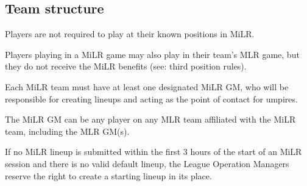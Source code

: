 \subsection{Team structure}
\begin{deepEnumerate}
	\item Players are not required to play at their known positions in MiLR.
    \item Players playing in a MiLR game may also play in their team's MLR game, but they do not receive the MiLR benefits (see: third position rules).
    \item Each MiLR team must have at least one designated MiLR GM, who will be responsible for creating lineups and acting as the point of contact for umpires.
    \begin{deepEnumerate}
        \item The MiLR GM can be any player on any MLR team affiliated with the MiLR team, including the MLR GM(s).
    \end{deepEnumerate}
    \item If no MiLR lineup is submitted within the first 3 hours of the start of an MiLR session and there is no valid default lineup, 
    the League Operation Managers reserve the right to create a starting lineup in its place.
\end{deepEnumerate}

